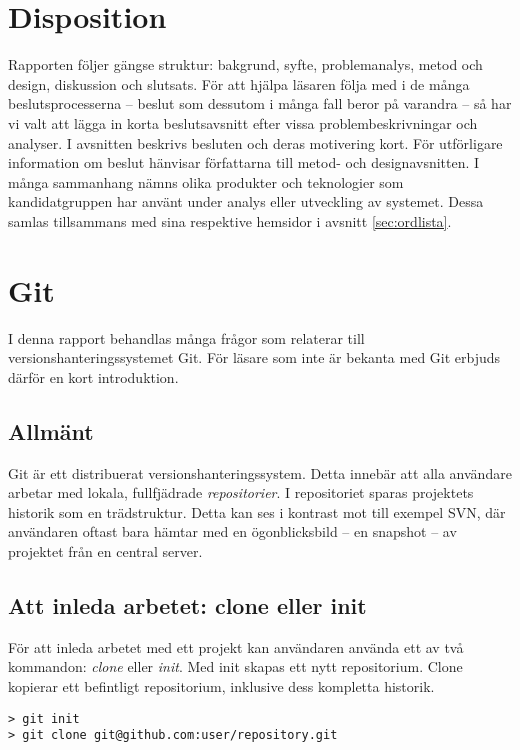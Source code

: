 \section{Disposition}

Rapporten följer gängse struktur: bakgrund, syfte, problemanalys, metod och design, diskussion och slutsats. För att hjälpa läsaren följa med i
de många beslutsprocesserna – beslut som dessutom i många fall beror på varandra – så har vi valt att lägga in korta beslutsavsnitt efter vissa
problembeskrivningar och analyser. I avsnitten beskrivs besluten och deras motivering kort. För utförligare information om beslut hänvisar
författarna till metod- och designavsnitten. I många sammanhang nämns olika produkter och teknologier som kandidatgruppen har använt under analys
eller utveckling av systemet. Dessa samlas tillsammans med sina respektive hemsidor i avsnitt \ref{sec:ordlista}.

\section{Git}
I denna rapport behandlas många frågor som relaterar till versionshanteringssystemet Git. 
För läsare som inte är bekanta med Git erbjuds därför en kort introduktion.

\subsection{Allmänt}
Git är ett distribuerat versionshanteringssystem. Detta innebär att alla användare arbetar med lokala, fullfjädrade \emph{repositorier}. I repositoriet sparas projektets historik som en trädstruktur. Detta kan ses i kontrast mot till exempel SVN, där användaren oftast bara hämtar med en ögonblicksbild – en snapshot – av projektet från en central server.

\subsection{Att inleda arbetet: clone eller init}
För att inleda arbetet med ett projekt kan användaren använda ett av två kommandon: \emph{clone} eller \emph{init}. Med init skapas ett nytt repositorium. Clone kopierar ett befintligt repositorium, inklusive dess kompletta historik.

\begin{Verbatim}
> git init
> git clone git@github.com:user/repository.git
\end{Verbatim}

